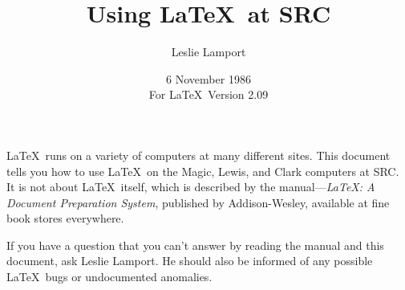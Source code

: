 %
%



\newcommand{\contact}{Leslie Lamport}

\newcommand{\BibTeX}{{\rm B\kern-.05em{\sc i\kern-.025em b}\kern-.08em
    T\kern-.1667em\lower.7ex\hbox{E}\kern-.125emX}}

\newcommand{\SLiTeX}{{\rm S\kern-.06em{\sc l\kern-.035emi}\kern-.06em T\kern
   -.1667em\lower.7ex\hbox{E}\kern-.125emX}}


\newcommand\bs{\char '134 }  %


\title{Using \LaTeX\ at SRC}

\author{Leslie Lamport}

\date{6 November 1986\\              %
For \LaTeX\ Version 2.09} 



\maketitle

\tableofcontents

\newpage

\LaTeX\ runs on a variety of computers at many different sites.  This
document tells you how to use \LaTeX\ on the Magic, Lewis, and Clark
computers at SRC. It is not about \LaTeX\ itself, which is described by
the manual---{\em \LaTeX: A Document Preparation System}, published by
Addison-Wesley, available at fine book stores everywhere.

If you have a question that you can't answer by reading the manual and
this document, ask \contact.  He should also be informed of any
possible \LaTeX\ bugs or undocumented anomalies.


